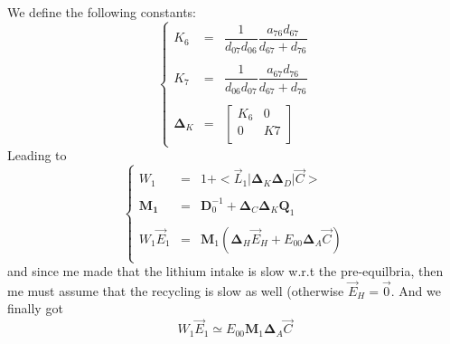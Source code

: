 \documentclass[aps,onecolumn,11pt]{revtex4}
\newcommand{\mymat}[1]{{\bm{#1}}}
\begin{document}
We define the following constants:
\begin{equation}
\left\lbrace
\begin{array}{rcl}
K_6 & = & \dfrac{1}{d_{07}d_{06}}  \dfrac{a_{76}d_{67}}{d_{67}+d_{76}} \\
\\
K_7 & = &  \dfrac{1}{d_{06}d_{07}} \dfrac{a_{67}d_{76}}{d_{67}+d_{76}} \\
\\
\mymat{\Delta}_K & = & \begin{bmatrix} K_6 & 0 \\ 0 & K7 \\ \end{bmatrix}
\end{array}
\right.
\end{equation}
Leading to
\begin{equation}
\left\lbrace
\begin{array}{rcl}
W_1 & = & 1 +  <\vec{L}_1| \mymat{\Delta}_K \mymat{\Delta}_D | \vec{C}> \\
\\
\mymat{M_1} & = & \mymat{D}_0^{-1} + \mymat{\Delta}_C \mymat{\Delta}_K \mymat{Q}_1 \\
\\
W_1 \vec{E}_1 & = & \mymat{M}_1 \left( 
	\mymat{\Delta}_H \vec{E}_H + E_{00} \mymat{\Delta}_A \vec{C}
	\right)\\
\end{array}
\right.
\end{equation}
and since me made that the lithium intake is slow w.r.t the pre-equilbria, then me must assume that the
recycling is slow as well (otherwise $\vec{E}_H=\vec{0}$.
And we finally got
\begin{equation}
	W_1 \vec{E}_1  \simeq E_{00} \mymat{M}_1  \mymat{\Delta}_A \vec{C}
\end{equation}
\end{document}
